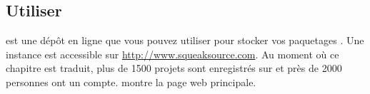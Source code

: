 \documentclass[a4paper,10pt,twoside]{book}
\begin{document}








\subsection{Utiliser \sqsrc}

\indmain{\sqsrc} est une dépôt en ligne que vous pouvez utiliser pour
stocker vos paquetages \MC. Une instance est accessible sur
\url{http://www.squeaksource.com}.
Au moment où ce chapitre est traduit, plus de 1500 projets sont
enregistrés sur \sqsrc et près de 2000 personnes ont un compte.
 montre la page web principale.
\end{document}
